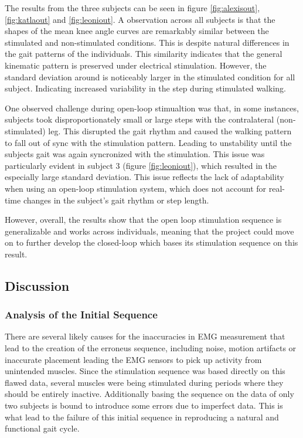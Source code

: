 The results from the three subjects can be seen in figure \ref{fig:alexisout}, \ref{fig:katlaout} and \ref{fig:leoniout}. A observation across all subjects is that the shapes of the mean knee angle curves are remarkably similar between the stimulated and non-stimulated conditions. This is despite natural differences in the gait patterns of the individuals. This similarity indicates that the general kinematic pattern is preserved under electrical stimulation. However, the standard deviation around is noticeably larger in the stimulated condition for all subject. Indicating increased variability in the step during stimulated walking.

One observed challenge during open-loop stimualtion was that, in some instances, subjects took disproportionately small or large steps with the contralateral (non-stimulated) leg. This disrupted the gait rhythm and caused the walking pattern to fall out of sync with the stimulation pattern. Leading to unstability until the subjects gait was again syncronized with the stimulation. This issue was particularly evident in subject 3 (figure \ref{fig:leoniout}), which resulted in the especially large standard deviation. This issue reflects the lack of adaptability when using an open-loop stimulation system, which does not account for real-time changes in the subject's gait rhythm or step length. 

However, overall, the results show that the open loop stimulation sequence is generalizable and works across individuals, meaning that the project could move on to further develop the closed-loop which bases its stimulation sequence on this result.

\subsection{Discussion}
\subsubsection{Analysis of the Initial Sequence}
There are several likely causes for the inaccuracies in EMG measurement that lead to the creation of the erroneus sequence, including noise, motion artifacts or inaccurate placement leading the EMG sensors to pick up activity from unintended muscles. Since the stimulation sequence was based directly on this flawed data, several muscles were being stimulated during periods where they should be entirely inactive. Additionally basing the sequence on the data of only two subjects is bound to introduce some errors due to imperfect data. This is what lead to the failure of this initial sequence in reproducing a natural and functional gait cycle. 

